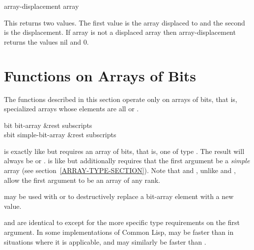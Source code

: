 \begin{defun}[Function]
array-displacement array

This returns two values. The first value is the array displaced to and the
second is the displacement. If array is not a displaced array then
array-displacement returns the values nil and 0.
\end{defun}

\section{Functions on Arrays of Bits}

The functions described in this section operate only
on arrays of bits, that is, specialized arrays whose elements
are all  or .

\begin{defun}[Function]
bit bit-array &rest subscripts \\
sbit simple-bit-array &rest subscripts

 is exactly like  but requires an array of bits,
that is, one of type .
The result will always be  or .
 is like  but additionally requires that the first
argument be a \emph{simple} array (see section~\ref{ARRAY-TYPE-SECTION}).
Note that  and , unlike  and ,
allow the first argument to be an array of any rank.

 may be used with  or  to destructively replace
a bit-array element with a new value.

 and  are identical to  except for the
more specific type requirements on the first argument.
In some implementations of Common Lisp,
 may be faster than  in situations where it is applicable,
and  may similarly be faster than .
\end{defun}

